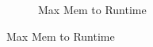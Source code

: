 \documentclass[../draft.tex]{subfiles}
\begin{document}
    \begin{figure}[tbp]
        \begin{subfigure}[b]{\textwidth}
            \centering
            \begin{subfigure}[]{0.45\textwidth}
                \centering
                \resizebox{\columnwidth}{!}{
                    
                }
            \end{subfigure}
            \qquad
            \begin{subfigure}[]{0.45\textwidth}
                \centering
                \resizebox{\columnwidth}{!}{
                    
                }
            \end{subfigure}
            \caption{Max Mem to Runtime}
        \end{subfigure}
    \end{figure}
\end{document}
